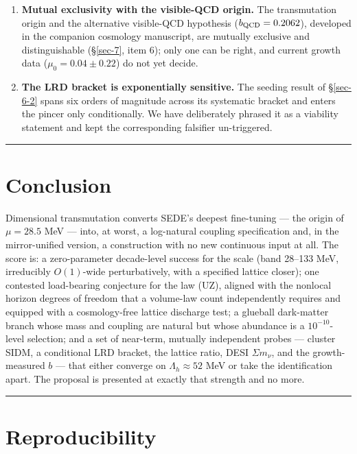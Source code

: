 \documentclass[preprint,12pt]{elsarticle}
\begin{document}
\begin{enumerate}
\item
  \textbf{Mutual exclusivity with the visible-QCD origin.} The
  transmutation origin and the alternative visible-QCD hypothesis
  (\(b_{\rm QCD} = 0.2062\)), developed in the companion cosmology
  manuscript, are mutually exclusive and distinguishable (§\ref{sec-7},
  item 6); only one can be right, and current growth data
  (\(\mu_0 = 0.04 \pm 0.22\)) do not yet decide.
\item
  \textbf{The LRD bracket is exponentially sensitive.} The seeding
  result of §\ref{sec-6-2} spans six orders of magnitude across its
  systematic bracket and enters the pincer only conditionally. We have
  deliberately phrased it as a viability statement and kept the
  corresponding falsifier un-triggered.
\end{enumerate}

\begin{center}\rule{0.5\linewidth}{0.5pt}\end{center}

\section{Conclusion}\label{sec-9}

Dimensional transmutation converts SEDE's deepest fine-tuning --- the
origin of \(\mu = 28.5\) MeV --- into, at worst, a log-natural coupling
specification and, in the mirror-unified version, a construction with no
new continuous input at all. The score is: a zero-parameter decade-level
success for the scale (band 28--133 MeV, irreducibly \(O(1)\)-wide
perturbatively, with a specified lattice closer); one contested
load-bearing conjecture for the law (UZ), aligned with the nonlocal
horizon degrees of freedom that a volume-law count independently
requires and equipped with a cosmology-free lattice discharge test; a
glueball dark-matter branch whose mass and coupling are natural but
whose abundance is a \(10^{-10}\)-level selection; and a set of
near-term, mutually independent probes --- cluster SIDM, a conditional
LRD bracket, the lattice ratio, DESI \(\Sigma m_\nu\), and the
growth-measured \(b\) --- that either converge on
\(\Lambda_h \approx 52\) MeV or take the identification apart. The
proposal is presented at exactly that strength and no more.

\begin{center}\rule{0.5\linewidth}{0.5pt}\end{center}

\section{Reproducibility}\label{sec-10}
\end{document}
